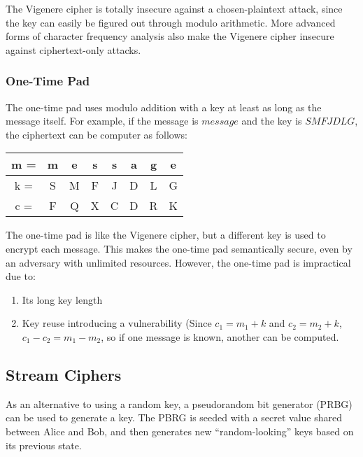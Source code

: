 \documentclass[12pt,titlepage]{article}
\begin{document}
        The Vigenere cipher is totally insecure against a chosen-plaintext attack, since the key can easily be figured out through modulo arithmetic.
        More advanced forms of character frequency analysis also make the Vigenere cipher insecure against ciphertext-only attacks.

      \subsubsection{One-Time Pad}
        The one-time pad uses modulo addition with a key at least as long as the message itself. For example, if the message is $message$
        and the key is $SMFJDLG$, the ciphertext can be computer as follows:

        \begin{table}[H]
          \centering
          \begin{tabular}{ | c | c c c c c c c | }
            \hline
            m = & m & e & s & s & a & g & e \\
            \hline
            k = & S & M & F & J & D & L & G \\
            \hline
            c = & F & Q & X & C & D & R & K \\
            \hline
          \end{tabular}
        \end{table}

        The one-time pad is like the Vigenere cipher, but a different key is used to encrypt each message. This makes the one-time pad semantically secure,
        even by an adversary with unlimited resources. However, the one-time pad is impractical due to:
        \begin{enumerate}
          \item Its long key length
          \item Key reuse introducing a vulnerability (Since $c_1 = m_1 + k$ and $c_2 = m_2 + k$, $c_1 - c_2 = m_1 - m_2$, so if one message
            is known, another can be computed.
        \end{enumerate}

    \subsection{Stream Ciphers}
      As an alternative to using a random key, a pseudorandom bit generator (PRBG) can be used to generate a key. The PBRG is seeded with a
      secret value shared between Alice and Bob, and then generates new ``random-looking'' keys based on its previous state.
\end{document}
